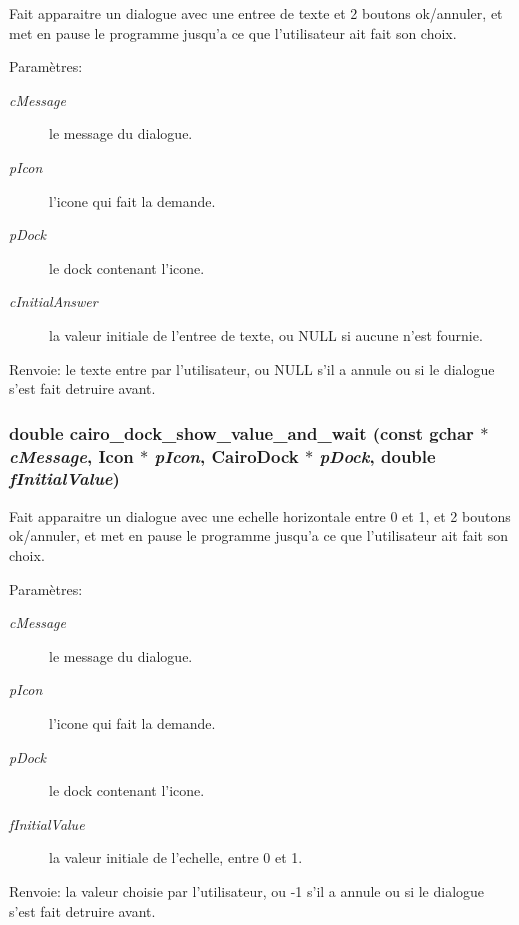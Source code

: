 Fait apparaitre un dialogue avec une entree de texte et 2 boutons ok/annuler, et met en pause le programme jusqu'a ce que l'utilisateur ait fait son choix. \begin{Desc}
\item[Param\`{e}tres:]
\begin{description}
\item[{\em c\-Message}]le message du dialogue. \item[{\em p\-Icon}]l'icone qui fait la demande. \item[{\em p\-Dock}]le dock contenant l'icone. \item[{\em c\-Initial\-Answer}]la valeur initiale de l'entree de texte, ou NULL si aucune n'est fournie. \end{description}
\end{Desc}
\begin{Desc}
\item[Renvoie:]le texte entre par l'utilisateur, ou NULL s'il a annule ou si le dialogue s'est fait detruire avant. \end{Desc}
\subsubsection{\setlength{\rightskip}{0pt plus 5cm}double cairo\_\-dock\_\-show\_\-value\_\-and\_\-wait (const gchar $\ast$ {\em c\-Message}, {\bf Icon} $\ast$ {\em p\-Icon}, {\bf Cairo\-Dock} $\ast$ {\em p\-Dock}, double {\em f\-Initial\-Value})}\label{cairo-dock-dialogs_8c_4a94dbbaa9c07c421c443c7cf10e63b7}


Fait apparaitre un dialogue avec une echelle horizontale entre 0 et 1, et 2 boutons ok/annuler, et met en pause le programme jusqu'a ce que l'utilisateur ait fait son choix. \begin{Desc}
\item[Param\`{e}tres:]
\begin{description}
\item[{\em c\-Message}]le message du dialogue. \item[{\em p\-Icon}]l'icone qui fait la demande. \item[{\em p\-Dock}]le dock contenant l'icone. \item[{\em f\-Initial\-Value}]la valeur initiale de l'echelle, entre 0 et 1. \end{description}
\end{Desc}
\begin{Desc}
\item[Renvoie:]la valeur choisie par l'utilisateur, ou -1 s'il a annule ou si le dialogue s'est fait detruire avant. \end{Desc}
